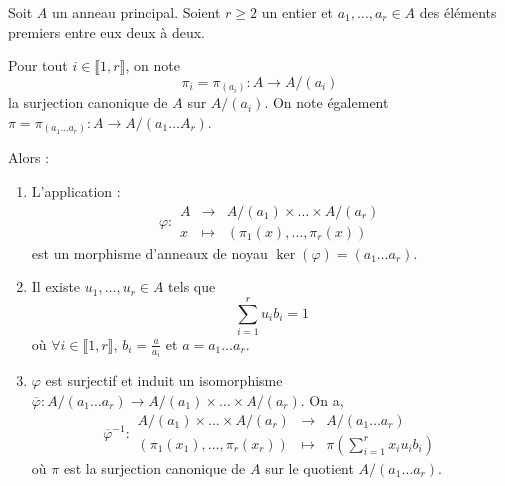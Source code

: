 





  Soit $A$ un anneau principal. Soient $r \geq 2$ un entier et $a_1, \dots, a_r \in A$ des éléments premiers entre eux deux à deux.

  \begin{notation}
    Pour tout $i \in \llbracket 1, r \rrbracket$, on note
    \[ \pi_i = \pi_{(a_i)} : A \rightarrow A/(a_i) \]
    la surjection canonique de $A$ sur $A/(a_i)$. On note également $\pi = \pi_{(a_1 \dots a_r)} : A \rightarrow A/(a_1 \dots A_r)$.
  \end{notation}

  \begin{theorem}[Chinois]
    \label{theoreme-chinois-1}
    Alors :
    \begin{enumerate}[label=(\roman*)]
      \item L'application :
      \[
        \varphi :
        \begin{array}{ccc}
          A &\rightarrow& A/(a_1) \times \dots \times A/(a_r) \\
          x &\mapsto& (\pi_1(x), \dots, \pi_r(x))
        \end{array}
      \]
      est un morphisme d'anneaux de noyau $\ker(\varphi) = (a_1 \dots a_r)$.
      \item Il existe $u_1, \dots, u_r \in A$ tels que
      \[ \sum_{i=1}^{r} u_i b_i = 1 \]
      où $\forall i \in \llbracket 1, r \rrbracket$, $b_i = \frac{a}{a_i}$ et $a = a_1 \dots a_r$.
      \item $\varphi$ est surjectif et induit un isomorphisme $\overline{\varphi} : A/(a_1 \dots a_r) \rightarrow A/(a_1) \times \dots \times A/(a_r)$. On a,
      \[
        \overline{\varphi}^{-1} :
        \begin{array}{ccc}
          A/(a_1) \times \dots \times A/(a_r) &\rightarrow& A/(a_1 \dots a_r) \\
          (\pi_1(x_1), \dots, \pi_r(x_r)) &\mapsto& \pi \left( \sum_{i=1}^{r} x_i u_i b_i \right)
        \end{array}
      \]
      où $\pi$ est la surjection canonique de $A$ sur le quotient $A/(a_1 \dots a_r)$.
    \end{enumerate}
  \end{theorem}

